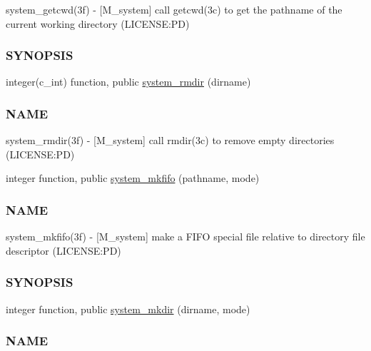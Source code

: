 \begin{DoxyCompactItemize}
\begin{DoxyCompactList}
system\+\_\+getcwd(3f) -\/ \mbox{[}M\+\_\+system\mbox{]} call getcwd(3c) to get the pathname of the current working directory (L\+I\+C\+E\+N\+SE\+:PD) \subsubsection*{S\+Y\+N\+O\+P\+S\+IS}\end{DoxyCompactList}\item 
integer(c\+\_\+int) function, public \mbox{\hyperlink{namespacem__system_a21fd3e1ccd50cef6adc539ef3d7a9836}{system\+\_\+rmdir}} (dirname)
\begin{DoxyCompactList}\small\item\em \subsubsection*{N\+A\+ME}

system\+\_\+rmdir(3f) -\/ \mbox{[}M\+\_\+system\mbox{]} call rmdir(3c) to remove empty directories (L\+I\+C\+E\+N\+SE\+:PD) \end{DoxyCompactList}\item 
integer function, public \mbox{\hyperlink{namespacem__system_ab2d95258ee26b85a0283538880775475}{system\+\_\+mkfifo}} (pathname, mode)
\begin{DoxyCompactList}\small\item\em \subsubsection*{N\+A\+ME}

system\+\_\+mkfifo(3f) -\/ \mbox{[}M\+\_\+system\mbox{]} make a F\+I\+FO special file relative to directory file descriptor (L\+I\+C\+E\+N\+SE\+:PD) \subsubsection*{S\+Y\+N\+O\+P\+S\+IS}\end{DoxyCompactList}\item 
integer function, public \mbox{\hyperlink{namespacem__system_a084d644c236d22af2cc75c6e48fd6e96}{system\+\_\+mkdir}} (dirname, mode)
\begin{DoxyCompactList}\small\item\em \subsubsection*{N\+A\+ME}


\end{DoxyCompactList}
\end{DoxyCompactItemize}
